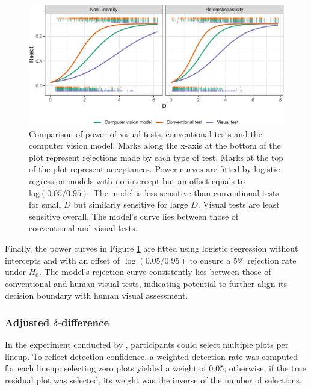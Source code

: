 \documentclass[]{interact}
\theoremstyle{plain}%
\theoremstyle{definition}
\theoremstyle{remark}
\begin{document}
\begin{figure}[!h]

{\centering \includegraphics[width=1\linewidth]{paper_files/figure-latex/power-1} 

}

\caption{Comparison of power of visual tests, conventional tests and the computer vision model. Marks along the x-axis at the bottom of the plot represent rejections made by each type of test. Marks at the top of the plot represent acceptances. Power curves are fitted by logistic regression models with no intercept but an offset equals to $\text{log}(0.05/0.95)$. The model is less sensitive than conventional tests for small $D$ but similarly sensitive for large $D$. Visual tests are least sensitive overall. The model’s curve lies between those of conventional and visual tests.}\label{fig:power}
\end{figure}

Finally, the power curves in Figure \ref{fig:power} are fitted using
logistic regression without intercepts and with an offset of
\(\log(0.05/0.95)\) to ensure a 5\% rejection rate under \(H_0\). The
model's rejection curve consistently lies between those of conventional
and human visual tests, indicating potential to further align its
decision boundary with human visual assessment.

\subsubsection{\texorpdfstring{Adjusted
\(\delta\)-difference}{Adjusted \textbackslash delta-difference}}\label{adjusted-delta-difference}

In the experiment conducted by \citet{li2024plot}, participants could
select multiple plots per lineup. To reflect detection confidence, a
weighted detection rate was computed for each lineup: selecting zero
plots yielded a weight of 0.05; otherwise, if the true residual plot was
selected, its weight was the inverse of the number of selections.
\end{document}
